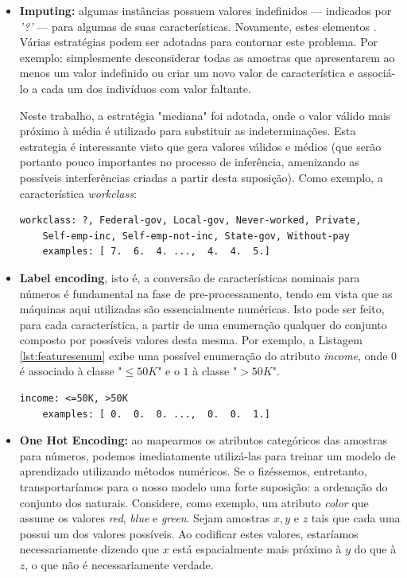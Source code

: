 \documentclass[12pt]{report}
\begin{document}
\begin{itemize}
	\item \textbf{Imputing:} algumas instâncias possuem valores indefinidos --- indicados por \textit{'?'} --- para algumas de suas características. Novamente, estes elementos . Várias estratégias podem ser adotadas para contornar este problema. Por exemplo: simplesmente desconsiderar todas as amostras que apresentarem ao menos um valor indefinido ou criar um novo valor de característica e associá-lo a cada um dos indivíduos com valor faltante.
	
	Neste trabalho, a estratégia "mediana" foi adotada, onde o valor válido mais próximo à média é utilizado para substituir as indeterminações. Esta estrategia é interessante visto que gera valores válidos e médios (que serão portanto pouco importantes no processo de inferência, amenizando as possíveis interferências criadas a partir desta suposição). Como exemplo, a característica \textit{workclass}:
	\begin{lstlisting}[label={lst:label}, caption={Possíveis valores para as características \textit{workclass}. Note que ao menos uma amostra do conjunto possue o valor indefinido para esta classe, já que \textit{?} foi identificado como um dos valores possíveis. Em seguida, observa-se exemplos de como tais classes foram mapeadas para números.}]
	workclass: ?, Federal-gov, Local-gov, Never-worked, Private,
	Self-emp-inc, Self-emp-not-inc, State-gov, Without-pay
	examples: [ 7.  6.  4. ...,  4.  4.  5.]
	\end{lstlisting}
	
	\item \textbf{Label encoding}, isto é, a conversão de características nominais para números é fundamental na fase de pre-processamento, tendo em vista que as máquinas aqui utilizadas são essencialmente numéricas. Isto pode ser feito, para cada característica, a partir de uma enumeração qualquer do conjunto composto por possíveis valores desta mesma. Por exemplo, a Listagem \ref{lst:featuresenum} exibe uma possível enumeração do atributo \textit{income}, onde $0$ é associado à classe "$\le50K$" e o $1$ à classe "$>50K$".
	
	\begin{lstlisting}[label={lst:featuresenum}, caption={Possível enumeração para a característica \textit{income}.}]
	income: <=50K, >50K
	examples: [ 0.  0.  0. ...,  0.  0.  1.]
	\end{lstlisting}
	
	\item \textbf{One Hot Encoding:} ao mapearmos os atributos categóricos das amostras para números, podemos imediatamente utilizá-las para treinar um modelo de aprendizado utilizando métodos numéricos. Se o fizéssemos, entretanto, transportaríamos para o nosso modelo uma forte suposição: a ordenação do conjunto dos naturais. Considere, como exemplo, um atributo \textit{color} que assume os valores \textit{red}, \textit{blue} e \textit{green}. Sejam amostras $x, y$ e $z$ tais que cada uma possui um dos valores possíveis. Ao codificar estes valores, estaríamos necessariamente dizendo que $x$ está espacialmente mais próximo à $y$ do que à $z$, o que não é necessariamente verdade.
	

\end{itemize}
\end{document}
